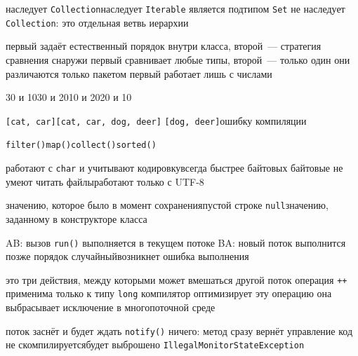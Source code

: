\begin{enumerate}

  {наследует \texttt{Collection}}{наследует \texttt{Iterable}}
  {является подтипом \texttt{Set}}
  {не наследует \texttt{Collection}: это отдельная ветвь иерархии}

  {первый задаёт естественный порядок внутри класса, второй~--- стратегия
   сравнения снаружи}
  {первый сравнивает любые типы, второй~--- только один}
  {они различаются только пакетом}
  {первый работает лишь с числами}

  {30 и 10}{30 и 20}{10 и 20}{20 и 10}

  {\texttt{[cat, car]}}{\texttt{[cat, car, dog, deer]}}
  {\texttt{[dog, deer]}}{ошибку компиляции}

  {\texttt{filter()}}{\texttt{map()}}{\texttt{collect()}}{\texttt{sorted()}}

  {работают с \texttt{char} и учитывают кодировку}{всегда быстрее байтовых}
  {байтовые не умеют читать файлы}{работают только с UTF-8}

  {значению, которое было в момент сохранения}{пустой строке}
  {\texttt{null}}{значению, заданному в конструкторе класса}

  {AB: вызов \texttt{run()} выполняется в текущем потоке}
  {BA: новый поток выполнится позже}
  {порядок случайный}{возникнет ошибка выполнения}

  {это три действия, между которыми может вмешаться другой поток}
  {операция \texttt{++} применима только к типу \texttt{long}}
  {компилятор оптимизирует эту операцию}
  {она выбрасывает исключение в многопоточной среде}

  {поток заснёт и будет ждать \texttt{notify()}}
  {ничего: метод сразу вернёт управление}
  {код не скомпилируется}{будет выброшено \texttt{IllegalMonitorStateException}}

\end{enumerate}
